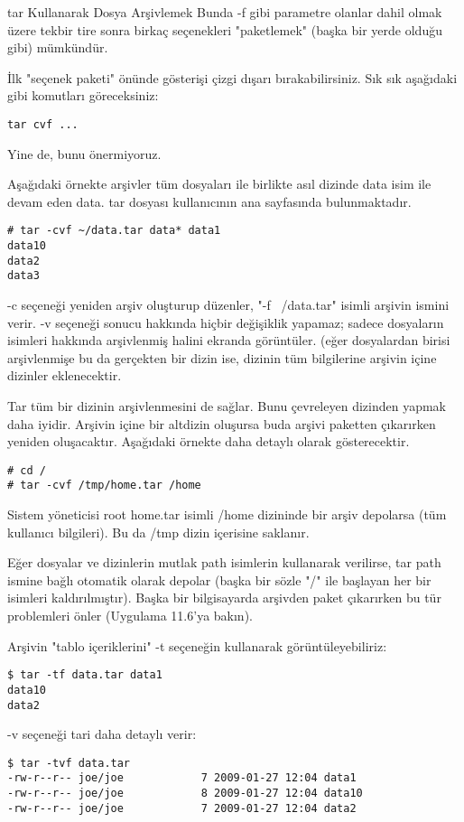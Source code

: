 \begin{section}{tar Kullanarak Dosya Arşivlemek}
Bunda -f gibi parametre olanlar dahil olmak üzere tekbir tire sonra birkaç seçenekleri "paketlemek" (başka bir yerde olduğu gibi) mümkündür.

İlk "seçenek paketi" önünde gösterişi çizgi dışarı bırakabilirsiniz. Sık sık aşağıdaki gibi komutları göreceksiniz:
\begin{verbatim}
tar cvf ...
\end{verbatim}
Yine de,  bunu önermiyoruz.

Aşağıdaki örnekte arşivler tüm dosyaları ile birlikte asıl dizinde data isim ile devam eden data. tar dosyası kullanıcının ana sayfasında bulunmaktadır.
\begin{verbatim}
# tar -cvf ~/data.tar data* data1
data10
data2
data3
\end{verbatim}
-c seçeneği yeniden arşiv oluşturup düzenler, "-f ~/data.tar" isimli arşivin ismini verir. -v seçeneği sonucu hakkında hiçbir değişiklik yapamaz; sadece dosyaların isimleri hakkında arşivlenmiş halini ekranda görüntüler. (eğer dosyalardan birisi arşivlenmişe bu da gerçekten bir dizin ise, dizinin tüm bilgilerine arşivin içine dizinler eklenecektir.

Tar tüm bir dizinin arşivlenmesini de sağlar. Bunu çevreleyen dizinden yapmak daha iyidir. Arşivin içine bir altdizin oluşursa buda arşivi paketten çıkarırken yeniden oluşacaktır. Aşağıdaki örnekte daha detaylı olarak gösterecektir.
\begin{verbatim}
# cd /
# tar -cvf /tmp/home.tar /home
\end{verbatim}

Sistem yöneticisi root home.tar isimli /home dizininde bir arşiv depolarsa (tüm kullanıcı bilgileri). Bu da /tmp dizin içerisine saklanır.

Eğer dosyalar ve dizinlerin mutlak path isimlerin kullanarak verilirse, tar path ismine bağlı otomatik olarak depolar (başka bir sözle "/" ile başlayan her bir isimleri kaldırılmıştır). Başka bir bilgisayarda arşivden paket çıkarırken bu tür problemleri önler (Uygulama 11.6'ya bakın).

Arşivin "tablo içeriklerini" -t seçeneğin kullanarak görüntüleyebiliriz:
\begin{verbatim}
$ tar -tf data.tar data1
data10
data2
\end{verbatim}

-v seçeneği tari daha detaylı verir:
\begin{verbatim}
$ tar -tvf data.tar
-rw-r--r-- joe/joe            7 2009-01-27 12:04 data1
-rw-r--r-- joe/joe            8 2009-01-27 12:04 data10
-rw-r--r-- joe/joe            7 2009-01-27 12:04 data2
\end{verbatim}


\end{section}

